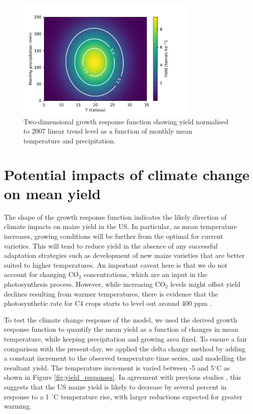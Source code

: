 \documentclass[12pt]{article}
\begin{document}
\begin{figure}
\centering
\includegraphics[width=0.8\textwidth]{./figures/2d_2_contour}
\caption{\label{fig:response_function} Two-dimensional growth response function showing yield normalised to 2007 linear trend level as a function of monthly mean temperature and precipitation.}
\end{figure}

\section{Potential impacts of climate change on mean yield}
\label{sec:impacts}

The shape of the growth response function indicates the likely direction of climate impacts on maize yield in the US. In particular, as mean temperature increases, growing conditions will be further from the optimal for current varieties. This will tend to reduce yield in the absence of any successful adaptation strategies such as development of new maize varieties that are better suited to higher temperatures. An important caveat here is that we do not account for changing CO$_{2}$ concentrations, which are an input in the photosynthesis process. However, while increasing CO$_{2}$ levels might offset yield declines resulting from warmer temperatures, there is evidence that the photosynthetic rate for C4 crops starts to level out around 400 ppm \citep[e.g.][]{leakey:2009}.

To test the climate change response of the model, we used the derived growth response function to quantify the mean yield as a function of changes in mean temperature, while keeping precipitation and growing area fixed. To ensure a fair comparison with the present-day, we applied the delta change method by adding a constant increment to the observed temperature time series, and modelling the resultant yield. The temperature increment is varied between -5 and 5$^\circ$C  as shown in Figure \ref{fig:yield_responses}. In agreement with previous studies \citep[e.g.][]{bassu:2014, urban:2015, lobell:2017}, this suggests that the US maize yield is likely to decrease by several percent in response to a 1 $^\circ$C temperature rise, with larger reductions expected for greater warming.
\end{document}
